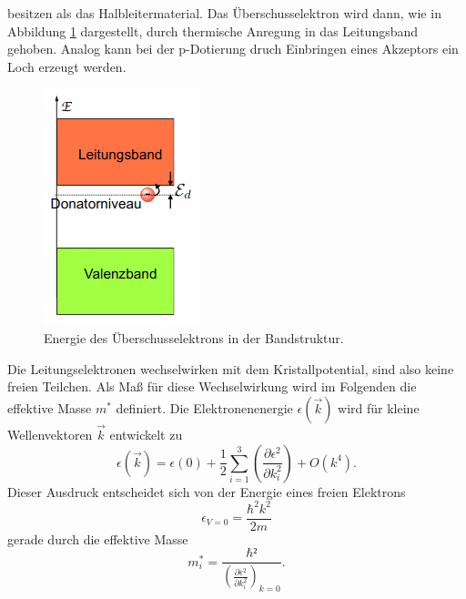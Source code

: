 besitzen als das Halbleitermaterial. Das Überschusselektron wird dann, wie in Abbildung \ref{fig:Donatorenergie} dargestellt, durch thermische Anregung in das
Leitungsband gehoben. Analog kann bei der p-Dotierung druch Einbringen eines Akzeptors ein Loch erzeugt werden. 
\begin{figure}[H]
    \centering
    \includegraphics[scale=0.8]{pictures/Donatorelektron.png}
    \caption{Energie des Überschusselektrons in der Bandstruktur. \cite{Halbleiter}}
    \label{fig:Donatorenergie}
\end{figure}
\noindent
Die Leitungselektronen wechselwirken mit dem Kristallpotential, sind also keine freien Teilchen. Als Maß für diese Wechselwirkung wird im Folgenden die 
effektive Masse $m^*$ definiert. Die Elektronenenergie $\epsilon(\vec{k})$ wird für kleine Wellenvektoren $\vec{k}$ entwickelt zu
\begin{equation}
    \epsilon(\vec{k})=\epsilon(0)+\frac{1}{2}\sum_{i=1}^3\left(\frac{\partial \epsilon^2}{\partial k_i^2}\right)+O(k^4) .
    \label{eqn:Taylor}
\end{equation}
Dieser Ausdruck entscheidet sich von der Energie eines freien Elektrons
\begin{equation*}
    \epsilon_{V=0}=\frac{\hbar^2 k^2}{2m}
\end{equation*}
gerade durch die effektive Masse
\begin{equation*}
    m_i^*=\frac{\hbar²}{\left(\frac{\partial \epsilon^2}{\partial k_i^2}\right)_{k=0}} .
\end{equation*}

